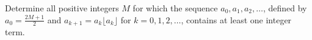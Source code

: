 Determine all positive integers $M$ for which the sequence $a_0, a_1, a_2, \ldots$, defined by $a_0 = \frac{2M+1}{2}$ and $a_{k+1} = a_k \lfloor a_k \rfloor$ for $k = 0, 1, 2, \ldots$, contains at least one integer term.
